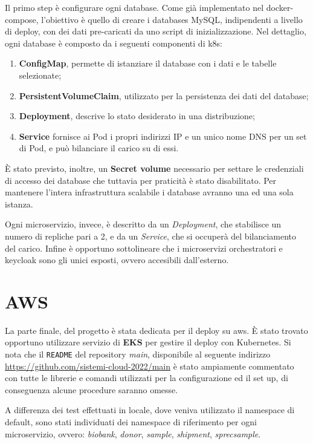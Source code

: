 \documentclass{article}
\begin{document}
Il primo step è configurare ogni database. Come già implementato nel docker-compose,
l’obiettivo è quello di creare i databases MySQL, indipendenti a livello di deploy, con dei dati pre-caricati da uno script di inizializzazione.
Nel dettaglio, ogni database è composto da i seguenti componenti di k8s:
\begin{enumerate}
    \item \textbf{ConfigMap}, permette di istanziare il database con i dati e le tabelle selezionate;
    \item \textbf{PersistentVolumeClaim}, utilizzato per la persistenza dei dati del database;
    \item \textbf{Deployment}, descrive lo stato desiderato in una distribuzione;
    \item \textbf{Service} fornisce ai Pod i propri indirizzi IP e un unico nome DNS per un set di Pod, e può bilanciare il carico su di essi.

\end{enumerate}

È stato previsto, inoltre, un \textbf{Secret volume} necessario per settare le credenziali di accesso dei database che tuttavia per praticità è stato disabilitato. Per mantenere l'intera infrastruttura
scalabile i database avranno una ed una sola istanza.

Ogni microservizio, invece, è descritto da un \textit{Deployment}, che stabilisce un numero di repliche pari a 2, e da un \textit{Service}, che si occuperà del bilanciamento del carico. Infine è opportuno sottolineare che i microservizi orchestratori e keycloak sono gli unici esposti, ovvero accesibili dall'esterno.


\section{AWS}

La parte finale, del progetto è stata dedicata per il deploy su aws.
È stato trovato opportuno utilizzare servizio di \textbf{EKS} per gestire il deploy con Kubernetes. Si nota che il \texttt{README} del repository \textit{main},
disponibile al seguente indirizzo \href{https://github.com/sistemi-cloud-2022/main}{https://github.com/sistemi-cloud-2022/main}
è stato ampiamente commentato con tutte le librerie e comandi 
utilizzati per la configurazione ed il set up, di conseguenza alcune procedure saranno omesse.

A differenza dei test effettuati in locale, dove veniva utilizzato il namespace di default, sono stati individuati dei namespace di riferimento per ogni microservizio,
ovvero: \textit{biobank}, \textit{donor}, \textit{sample}, \textit{shipment}, \textit{sprecsample}.  
\end{document}
